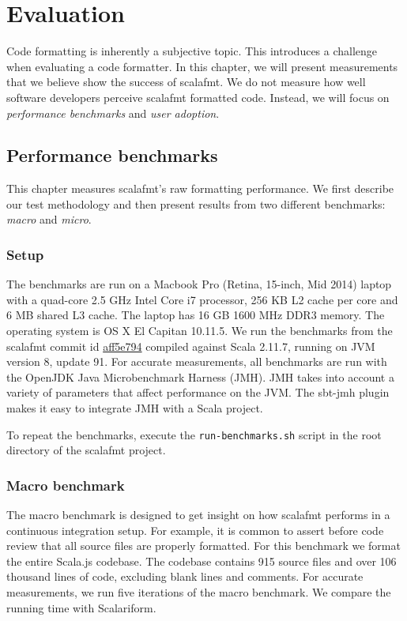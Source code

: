 \section{Evaluation}\label{sec:evaluation}
Code formatting is inherently a subjective topic.
This introduces a challenge when evaluating a code formatter.
In this chapter, we will present measurements that we believe show the success of scalafmt.
We do not measure how well software developers perceive scalafmt formatted code.
Instead, we will focus on \emph{performance benchmarks} and \emph{user adoption}.

\subsection{Performance benchmarks}
This chapter measures scalafmt's raw formatting performance.
We first describe our test methodology and then present results from two different benchmarks: \emph{macro} and \emph{micro}.

\subsubsection{Setup}
The benchmarks are run on a Macbook Pro (Retina, 15-inch, Mid 2014) laptop with a quad-core 2.5 GHz Intel Core i7 processor, 256 KB L2 cache per core and 6 MB shared L3 cache.
The laptop has 16 GB 1600 MHz DDR3 memory.
The operating system is OS X El Capitan 10.11.5.
We run the benchmarks from the scalafmt commit id \href{https://github.com/olafurpg/scalafmt/tree/aff5e794dae4787b08243f8abb87a3ca4d907e40}{aff5e794} compiled against Scala 2.11.7, running on JVM version 8, update 91.
For accurate measurements, all benchmarks are run with the OpenJDK Java Microbenchmark Harness (JMH)\autocite{OpenJ38:online}.
JMH takes into account a variety of parameters that affect performance on the JVM.
The sbt-jmh\autocite{ktoso84:online} plugin makes it easy to integrate JMH with a Scala project.

To repeat the benchmarks, execute the \texttt{run-benchmarks.sh} script in the root directory of the scalafmt project.

\subsubsection{Macro benchmark}
The macro benchmark is designed to get insight on how scalafmt performs in a continuous integration setup.
For example, it is common to assert before code review that all source files are properly formatted.
For this benchmark we format the entire Scala.js codebase.
The codebase contains 915 source files and over 106 thousand lines of code, excluding blank lines and comments.
For accurate measurements, we run five iterations of the macro benchmark.
We compare the running time with Scalariform.

